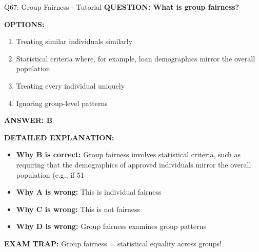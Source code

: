 \documentclass[8pt]{beamer}
\begin{document}
	\begin{frame}{Q67: Group Fairness - Tutorial}
		\fontsize{6.5}{7.5}\selectfont
		\textbf{QUESTION: What is group fairness?}
		
		\vspace{0.1cm}
		\textbf{OPTIONS:}
		\begin{enumerate}
			\item Treating similar individuals similarly
			\item Statistical criteria where, for example, loan demographics mirror the overall population
			\item Treating every individual uniquely
			\item Ignoring group-level patterns
		\end{enumerate}
		
		\vspace{0.1cm}
		\textcolor{myblue}{\textbf{ANSWER: B}}
		
		\vspace{0.1cm}
		\textbf{DETAILED EXPLANATION:}
		\begin{itemize}
			\item \textbf{Why B is correct:} Group fairness involves statistical criteria, such as requiring that the demographics of approved individuals mirror the overall population (e.g., if 51%
			\item \textbf{Why A is wrong:} This is individual fairness
			\item \textbf{Why C is wrong:} This is not fairness
			\item \textbf{Why D is wrong:} Group fairness examines group patterns
		\end{itemize}
		
		\textcolor{myred}{\textbf{EXAM TRAP:}} Group fairness = \textcolor{myblue}{statistical equality across groups}!
	\end{frame}
	
\end{document}
